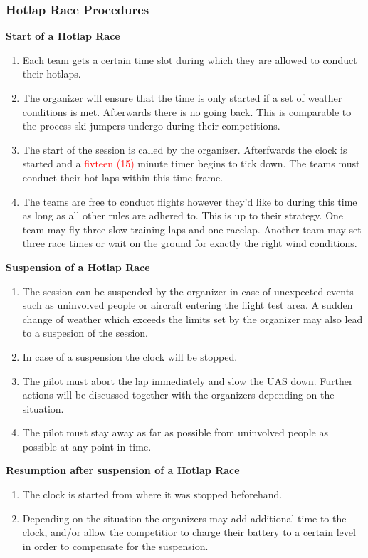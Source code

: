     \subsubsection{Hotlap Race Procedures}
    \textbf{Start of a Hotlap Race}
    \begin{enumerate}
      \item Each team gets a certain time slot during which they are allowed to conduct their hotlaps. 
      \item The organizer will ensure that the time is only started if a set of weather conditions is met. Afterwards there is no going back. This is comparable to the process ski jumpers undergo during their competitions.
      \item The start of the session is called by the organizer. Afterfwards the clock is started and a \textcolor{red}{fivteen (15)} minute timer begins to tick down. The teams must conduct their hot laps within this time frame.
      \item The teams are free to conduct flights however they'd like to during this time as long as all other rules are adhered to. This is up to their strategy. One team may fly three slow training laps and one racelap. Another team may set three race times or wait on the ground for exactly the right wind conditions.
    \end{enumerate}
    \textbf{Suspension of a Hotlap Race}
    \begin{enumerate}[resume]
      \item The session can be suspended by the organizer in case of unexpected events such as uninvolved people or aircraft entering the flight test area. A sudden change of weather which exceeds the limits set by the organizer may also lead to a suspesion of the session. 
      \item In case of a suspension the clock will be stopped. 
      \item The pilot must abort the lap immediately and slow the UAS down. Further actions will be discussed together with the organizers depending on the situation.
      \item The pilot must stay away as far as possible from uninvolved people as possible at any point in time. 
    \end{enumerate}

    \textbf{Resumption after suspension of a Hotlap Race}
    \begin{enumerate}[resume]
      \item The clock is started from where it was stopped beforehand.
      \item Depending on the situation the organizers may add additional time to the clock, and/or allow the competitior to charge their battery to a certain level in order to compensate for the suspension.
    \end{enumerate}

